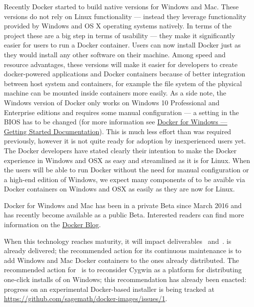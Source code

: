 \documentclass{deliverablereport}
\begin{document}
Recently Docker started to build native versions for Windows and
Mac. These versions do not rely on Linux functionality --- instead they
leverage functionality provided by Windows and OS X operating systems
natively. In terms of the \ODK project these are a big step in terms
of usability --- they make it significantly easier for users to run a
Docker container. Users can now install Docker just as they would
install any other software on their machine. Among speed and resource
advantages, these versions will make it easier for developers to
create docker-powered applications and Docker containers because of
better integration between host system and containers, for example the
file system of the physical machine can be mounted inside containers
more easily. As a side note, the Windows version of Docker only works
on Windows 10 Professional and Enterprise editions and requires some
manual configuration --- a setting in the BIOS has to be changed (for
more information see
\href{https://docs.docker.com/docker-for-windows/#/what-to-know-before-you-install}{Docker
  for Windows --- Getting Started Documentation}). This is much less
effort than was required previously, however it is not quite ready for
adoption by inexperienced users yet. The Docker developers have stated
clearly their intention to make the Docker experience in Windows and
OSX as easy and streamlined as it is for Linux. When the users will be
able to run Docker without the need for manual configuration or a
high-end edition of Windows, we expect many components of \ODK to be
avaible via Docker containers on Windows and OSX as easily as they are
now for Linux.

Docker for Windows and Mac has been in a private Beta since March 2016
and has recently become available as a public Beta. Interested
readers can find more information on the
\href{https://blog.docker.com/2016/06/docker-mac-windows-public-beta/}{Docker
  Blog}.

When this technology reaches maturity, it will impact
deliverables~
and~.
 is already
delivered; the recommended action for its continuous maintenance is to
add Windows and Mac Docker containers to the ones already
distributed. The recommended action
for~ is to
reconsider Cygwin as a platform for distributing one-click installs of
\Sage on Windows; this recommendation has already been enacted:
progress on an experimental Docker-based installer is being tracked at
\url{https://github.com/sagemath/docker-images/issues/1}.
\end{document}
